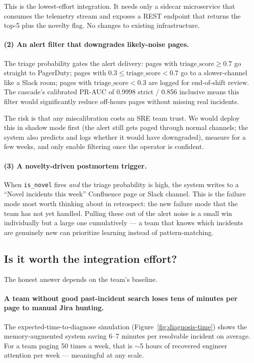 This is the lowest-effort integration. It needs only a sidecar microservice that consumes the telemetry stream and exposes a REST endpoint that returns the top-5 plus the novelty flag. No changes to existing infrastructure.

\paragraph{(2) An alert filter that downgrades likely-noise pages.}

The triage probability gates the alert delivery: pages with $\text{triage\_score} \geq 0.7$ go straight to PagerDuty; pages with $0.3 \leq \text{triage\_score} < 0.7$ go to a slower-channel like a Slack room; pages with $\text{triage\_score} < 0.3$ are logged for end-of-shift review. The cascade's calibrated PR-AUC of 0.9998 strict / 0.856 inclusive means this filter would significantly reduce off-hours pages without missing real incidents.

The risk is that any miscalibration costs an SRE team trust. We would deploy this in shadow mode first (the alert still gets paged through normal channels; the system also predicts and logs whether it would have downgraded), measure for a few weeks, and only enable filtering once the operator is confident.

\paragraph{(3) A novelty-driven postmortem trigger.}

When \texttt{is\_novel} fires \emph{and} the triage probability is high, the system writes to a ``Novel incidents this week'' Confluence page or Slack channel. This is the failure mode most worth thinking about in retrospect: the new failure mode that the team has not yet handled. Pulling these out of the alert noise is a small win individually but a large one cumulatively --- a team that knows which incidents are genuinely new can prioritize learning instead of pattern-matching.

\subsection{Is it worth the integration effort?}

The honest answer depends on the team's baseline.

\paragraph{A team without good past-incident search loses tens of minutes per page to manual Jira hunting.} The expected-time-to-diagnose simulation (Figure~\ref{fig:diagnosis-time}) shows the memory-augmented system saving 6--7 minutes per resolvable incident on average. For a team paging 50 times a week, that is $\sim$5 hours of recovered engineer attention per week --- meaningful at any scale.

